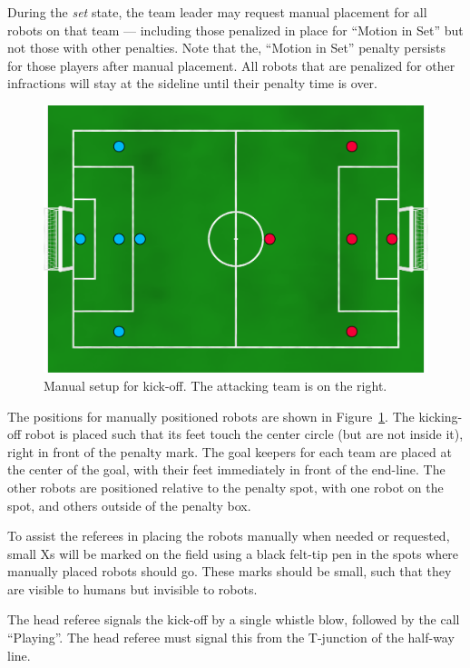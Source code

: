 \documentclass[12pt]{article}
\begin{document}
During the \textit{set} state, the team leader may request manual placement for all robots on that team --- including those penalized in place for ``Motion in Set'' but not those with other penalties.
Note that the, ``Motion in Set'' penalty persists for those players after manual placement. All robots that are penalized for other infractions will stay at the sideline until their penalty time is over.

\begin{figure}[t]
\centerline{\includegraphics[width=\columnwidth]{figs/manual-placement-2020.png}}
\caption{Manual setup for kick-off.  The attacking team is on the right.}
\label{fig:ko}
\end{figure}

The positions for manually positioned robots are shown in Figure~\ref{fig:ko}. The kicking-off robot is placed such that its feet touch the center circle (but are not inside it), right in front of the penalty mark. The goal keepers for each team are placed at the center of the goal, with their feet immediately in front of the end-line.
The other robots are positioned relative to the penalty spot, with one robot on the spot, and others outside of the penalty box.

To assist the referees in placing the robots manually when needed or requested, small Xs will be marked on the field using a black felt-tip pen in the spots where manually placed robots should go.  These marks should be small, such that they are visible to humans but invisible to robots.

The head referee signals the kick-off by a single whistle blow, followed by the call ``Playing''. The head referee must signal this from the T-junction of the half-way line.
\end{document}
